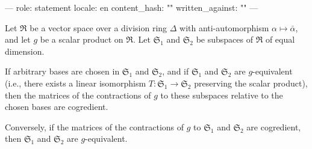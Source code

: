 ---
role: statement
locale: en
content_hash: ""
written_against: ""
---

Let $\mathfrak{R}$ be a vector space over a division ring $\Delta$ with anti-automorphism $\alpha \mapsto \bar{\alpha}$, and let $g$ be a scalar product on $\mathfrak{R}$. Let $\mathfrak{S}_1$ and $\mathfrak{S}_2$ be subspaces of $\mathfrak{R}$ of equal dimension.

If arbitrary bases are chosen in $\mathfrak{S}_1$ and $\mathfrak{S}_2$, and if $\mathfrak{S}_1$ and $\mathfrak{S}_2$ are $g$-equivalent (i.e., there exists a linear isomorphism $T : \mathfrak{S}_1 \to \mathfrak{S}_2$ preserving the scalar product), then the matrices of the contractions of $g$ to these subspaces relative to the chosen bases are cogredient.

Conversely, if the matrices of the contractions of $g$ to $\mathfrak{S}_1$ and $\mathfrak{S}_2$ are cogredient, then $\mathfrak{S}_1$ and $\mathfrak{S}_2$ are $g$-equivalent.
